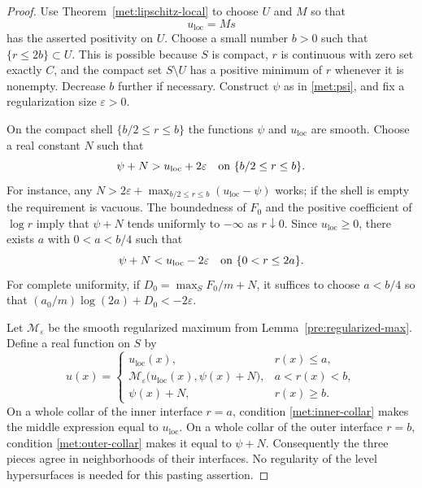 \documentclass[11pt,a4paper]{article}
\numberwithin{equation}{section}
\theoremstyle{definition}
\theoremstyle{remark}
\begin{document}
\begin{proof}
Use Theorem~\ref{met:lipschitz-local} to choose $U$ and $M$ so that
\[
                         u_{\mathrm{loc}}=Ms
\]
has the asserted positivity on $U$. Choose a small number $b>0$
such that $\{r\le2b\}\subset U$. This is possible because $S$ is
compact, $r$ is continuous with zero set exactly $C$, and the compact
set $S\setminus U$ has a positive minimum of $r$ whenever it is
nonempty. Decrease $b$ further if necessary. Construct $\psi$ as in
\eqref{met:psi}, and fix a regularization size $\varepsilon>0$.

On the compact shell $\{b/2\le r\le b\}$ the functions $\psi$ and
$u_{\mathrm{loc}}$ are smooth. Choose a real constant $N$ such that
\begin{equation}\label{met:outer-collar}
                 \psi+N>u_{\mathrm{loc}}+2\varepsilon
                     \quad\hbox{on }\{b/2\le r\le b\}.
\end{equation}
For instance, any $N>2\varepsilon+
\max_{b/2\le r\le b}(u_{\mathrm{loc}}-\psi)$ works; if the shell
is empty the requirement is vacuous. The boundedness of $F_0$ and
the positive coefficient of $\log r$ imply that $\psi+N$ tends
uniformly to $-\infty$ as $r\downarrow0$. Since
$u_{\mathrm{loc}}\ge0$, there exists $a$ with $0<a<b/4$ such that
\begin{equation}\label{met:inner-collar}
                 \psi+N<u_{\mathrm{loc}}-2\varepsilon
                         \quad\hbox{on }\{0<r\le2a\}.
\end{equation}
For complete uniformity, if $D_0=\max_S F_0/m+N$, it suffices to
choose $a<b/4$ so that
$(a_0/m)\log(2a)+D_0<-2\varepsilon$.

Let $\mathcal M_\varepsilon$ be the smooth regularized maximum from
Lemma~\ref{pre:regularized-max}. Define a real function on $S$ by
\begin{equation}\label{met:global-potential}
 u(x)=
 \begin{cases}
    u_{\mathrm{loc}}(x),& r(x)\le a,\\
    \mathcal M_\varepsilon
             \bigl(u_{\mathrm{loc}}(x),\psi(x)+N\bigr),
                                    &a<r(x)<b,\\
    \psi(x)+N,&r(x)\ge b.
 \end{cases}
\end{equation}
On a whole collar of the inner interface $r=a$, condition
\eqref{met:inner-collar} makes the middle expression equal to
$u_{\mathrm{loc}}$. On a whole collar of the outer interface $r=b$,
condition \eqref{met:outer-collar} makes it equal to $\psi+N$.
Consequently the three pieces agree in neighborhoods of their
interfaces. No regularity of the level hypersurfaces is needed for
this pasting assertion.


\end{proof}
\end{document}
